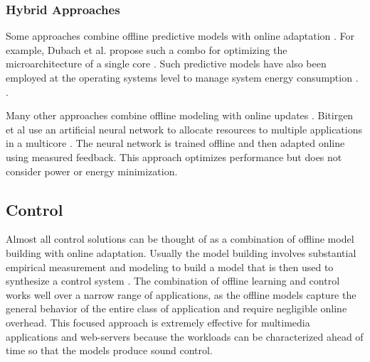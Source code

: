 \subsubsection{Hybrid Approaches}
Some approaches combine offline predictive models with online
adaptation
\cite{Zhang2012,packandcap,Winter2010,dubach2010,Koala,Cinder,
  wu2012inferred}.  For example, Dubach et al.  propose such a combo
for optimizing the microarchitecture of a single core
\cite{dubach2010}.  Such predictive models have also been employed at
the operating systems level to manage system energy consumption \cite{Koala,Cinder}.
\cite{wu2012inferred}.


Many other approaches combine offline modeling with online
updates \cite{JouleGuard,Bitirgen2008,Ipek}.  Bitirgen et
al use an artificial neural network to allocate resources to multiple
applications in a multicore \cite{Bitirgen2008}.  The neural network
is trained offline and then adapted online using measured feedback.
This approach optimizes performance but does not consider power or
energy minimization. 

\subsection{Control}
Almost all control solutions can be thought of as a combination of
offline model building with online adaptation.  Usually the model
building involves substantial empirical measurement and modeling to build a model that is then used to synthesize a control
system
\cite{Wu2004,TCST,Chen2011,PTRADE,POET,ControlWare,Agilos,Rajkumar,Sojka,Raghavendra2008}.
The combination of offline
learning and control works well over a narrow range of applications, as the offline models capture the
general behavior of the entire class of application and require
negligible online overhead.  This focused approach is extremely
effective for multimedia applications
\cite{grace2,flinn99,flinn2004,xtune,TCST} and web-servers
\cite{Horvarth,LuEtAl-2006a,SunDaiPan-2008a} because the workloads can
be characterized ahead of time so that the models produce sound
control.

